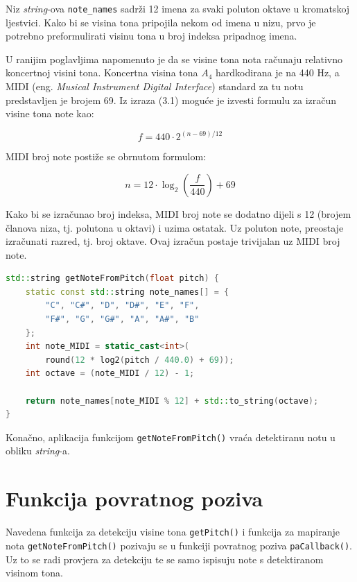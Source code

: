 \documentclass[times, utf8, diplomski, numeric]{fer}
\begin{document}
Niz \textit{string}-ova \lstinline[basicstyle=\ttfamily]|note_names| sadrži 12 imena za svaki poluton oktave u kromatskoj ljestvici. Kako bi se visina tona pripojila nekom od imena u nizu, prvo je potrebno preformulirati visinu tona u broj indeksa pripadnog imena.

U ranijim poglavljima napomenuto je da se visine tona nota računaju relativno koncertnoj visini tona. Koncertna visina tona $A_4$ hardkodirana je na 440 Hz, a MIDI (eng. \textit{Musical Instrument Digital Interface}) standard za tu notu predstavljen je brojem 69.\cite{inspiredacousticsMIDINote} Iz izraza (3.1) moguće je izvesti formulu za izračun visine tona note kao:

\begin{equation}
	f = 440 \cdot 2^{(n-69)/12}
\end{equation}

MIDI broj note postiže se obrnutom formulom:

\begin{equation}
	n = 12 \cdot \log_2(\frac{f}{440}) + 69
\end{equation}

Kako bi se izračunao broj indeksa, MIDI broj note se dodatno dijeli s 12 (brojem članova niza, tj. polutona u oktavi) i uzima ostatak. Uz poluton note, preostaje izračunati razred, tj. broj oktave. Ovaj izračun postaje trivijalan uz MIDI broj note.

\begin{lstlisting}[language=C++, frame=single]
std::string getNoteFromPitch(float pitch) {
	static const std::string note_names[] = {
		"C", "C#", "D", "D#", "E", "F",
		"F#", "G", "G#", "A", "A#", "B"
	};
	int note_MIDI = static_cast<int>(
		round(12 * log2(pitch / 440.0) + 69));
	int octave = (note_MIDI / 12) - 1;
	
	return note_names[note_MIDI % 12] + std::to_string(octave);
}
\end{lstlisting}

Konačno, aplikacija funkcijom \lstinline[basicstyle=\ttfamily]|getNoteFromPitch()| vraća detektiranu notu u obliku \textit{string}-a.

\section{Funkcija povratnog poziva}
%
Navedena funkcija za detekciju visine tona \lstinline[basicstyle=\ttfamily]|getPitch()| i funkcija za mapiranje nota \lstinline[basicstyle=\ttfamily]|getNoteFromPitch()| pozivaju se u funkciji povratnog poziva \lstinline[basicstyle=\ttfamily]|paCallback()|. Uz to se radi provjera za detekciju te se samo ispisuju note s detektiranom visinom tona.
\end{document}
